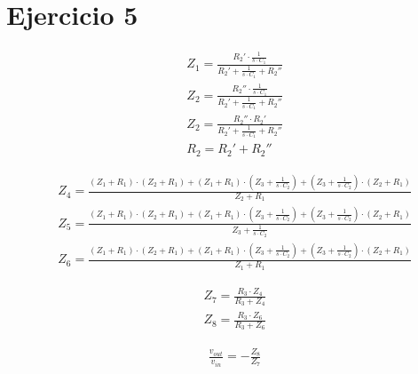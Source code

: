 \section{Ejercicio 5}

\begin{align}
    &Z_1 = \frac{R_2' \cdot \frac{1}{s \cdot C_1}}{R_2' + \frac{1}{s \cdot C_1} + R_2''}  \label{eq:ej5_z1} \\
    &Z_2 = \frac{R_2'' \cdot \frac{1}{s \cdot C_1}}{R_2' + \frac{1}{s \cdot C_1} + R_2''}  \label{eq:ej5_z2} \\
    &Z_2 = \frac{R_2'' \cdot R_2'}{R_2' + \frac{1}{s \cdot C_1} + R_2''}  \label{eq:ej5_z3} \\
    &R_2 = R_2' + R_2'' \label{eq:ej5_r2}
\end{align}

\begin{align}
    &Z_4 = \frac{\left(Z_1 + R_1\right) \cdot \left(Z_2 + R_1\right) + \left(Z_1 + R_1\right) \cdot \left(Z_3 + \frac{1}{s \cdot C_2}\right) + \left(Z_3 + \frac{1}{s \cdot C_2}\right) \cdot \left(Z_2 + R_1\right)}{Z_2 + R_1}  \label{eq:ej5_z4} \\
    &Z_5 = \frac{\left(Z_1 + R_1\right) \cdot \left(Z_2 + R_1\right) + \left(Z_1 + R_1\right) \cdot \left(Z_3 + \frac{1}{s \cdot C_2}\right) + \left(Z_3 + \frac{1}{s \cdot C_2}\right) \cdot \left(Z_2 + R_1\right)}{Z_3 + \frac{1}{s \cdot C_2}}  \label{eq:ej5_z5} \\
    &Z_6 = \frac{\left(Z_1 + R_1\right) \cdot \left(Z_2 + R_1\right) + \left(Z_1 + R_1\right) \cdot \left(Z_3 + \frac{1}{s \cdot C_2}\right) + \left(Z_3 + \frac{1}{s \cdot C_2}\right) \cdot \left(Z_2 + R_1\right)}{Z_1 + R_1}  \label{eq:ej5_z6}
\end{align}

\begin{align}
    &Z_7 = \frac{R_3 \cdot Z_4}{R_3 + Z_4} \label{eq:ej5_z7} \\
    &Z_8 = \frac{R_3 \cdot Z_6}{R_3 + Z_6} \label{eq:ej5_z8}
\end{align}

\begin{align}
    &\frac{v_{out}}{v_{in}} = - \frac{Z_8}{Z_7}
\end{align}

